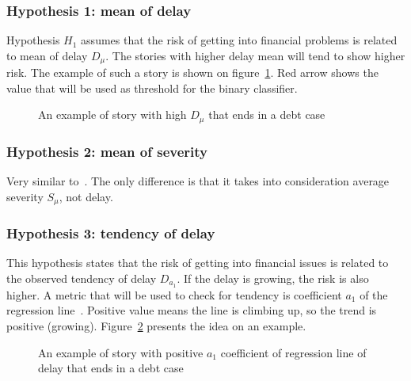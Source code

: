 \documentclass{article}
\begin{document}
\subsubsection{Hypothesis 1: mean of delay}
\label{section:H1}

Hypothesis $H_1$ assumes that the risk of getting into financial problems is related to mean of delay $D_\mu$.
The stories with higher delay mean will tend to show higher risk.
The example of such a story is shown on figure\ \ref{fig:302_h1_delay_mean_explained}.
Red arrow shows the value that will be used as threshold for the binary classifier.

\begin{figure}[htbp!]
    \begin{center}
        
    \caption{An example of story with high $D_\mu$ that ends in a debt case}
    \label{fig:302_h1_delay_mean_explained}
    \end{center}
\end{figure}

\subsubsection{Hypothesis 2: mean of severity}

Very similar to\ .
The only difference is that it takes into consideration average severity $S_{\mu}$, not delay.

\subsubsection{Hypothesis 3: tendency of delay}
\label{section:H3}

This hypothesis states that the risk of getting into financial issues is related to the observed tendency of delay $D_{a_1}$.
If the delay is growing, the risk is also higher.
A metric that will be used to check for tendency is coefficient $a_1$ of the regression line\ \cite{repetytorium}.
Positive value means the line is climbing up, so the trend is positive (growing).
Figure\ \ref{fig:303_h3_tendency_coefficient_explained} presents the idea on an example.


\begin{figure}[htbp!]
    \begin{center}
        
    \caption{An example of story with positive $a_1$ coefficient of regression line of delay that ends in a debt case}
    \label{fig:303_h3_tendency_coefficient_explained}
    \end{center}
\end{figure}
\end{document}
